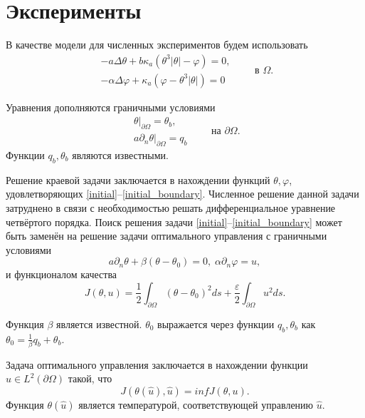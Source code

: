 \documentclass[10pt]{article}
\begin{document}
\section{Эксперименты}

В качестве модели для численных экспериментов будем использовать
\begin{equation}
\label{initial}
\begin{aligned}
	- a \Delta \theta + b \kappa_a(\theta ^ 3 | \theta | - \varphi) = 0,  \\ 
	- \alpha \Delta \varphi + \kappa_a (\varphi - \theta ^3 | \theta |) = 0
\end{aligned}
\qquad \text{в } \Omega.
\end{equation}

Уравнения дополняются граничными условиями
\begin{equation}
\label{initial_boundary}
\begin{aligned}
	\theta|_{\partial \Omega} = \theta_b, \\
	a \partial_n \theta |_{\partial \Omega} = q_b
\end{aligned}
\qquad \text{на } \partial \Omega.
\end{equation}
Функции $q_b, \theta_b$ являются известными. 

Решение краевой задачи заключается в нахождении функций $\theta, \varphi$, удовлетворяющих  \eqref{initial}--\eqref{initial_boundary}. Численное решение данной задачи затруднено в связи с необходимостью решать дифференциальное уравнение четвёртого порядка. Поиск решения задачи \eqref{initial}--\eqref{initial_boundary} может быть заменён на решение задачи оптимального управления с граничными условиями
\begin{equation}
	\label{initial_boundary_2}
	a \partial_n \theta + \beta (\theta -\theta_0) = 0, \; \alpha \partial_n \varphi = u,
\end{equation}
и функционалом качества
\begin{equation}
	\label{quality}
	J(\theta, u) = \frac{1}{2} \int_{\partial \Omega} (\theta - \theta_0)^2 ds + \frac{\varepsilon}{2} \int_{\partial \Omega} u^2 ds.
\end{equation}

Функция $\beta$ является известной. $\theta_0$ выражается через функции $q_b, \theta_b$ как $\theta_0 = \frac{1}{\beta}q_b + \theta_b$. 

Задача оптимального управления заключается в нахождении функции $\hat u \in L^2(\partial \Omega)$ такой, что
$$J(\theta(\hat u), \hat u) = inf J(\theta, u).$$
Функция $\theta(\hat u)$ является температурой, соответствующей управлению $\hat u$.
\end{document}
